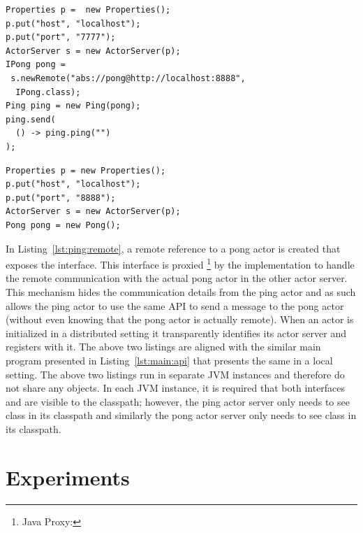 \begin{center}
\begin{minipage}[t]{0.48\textwidth}
\begin{lstlisting}[caption=Remote ping actor main,label=lst:ping:remote]
Properties p =  new Properties();
p.put("host", "localhost");
p.put("port", "7777");
ActorServer s = new ActorServer(p);
IPong pong = 
 s.newRemote("abs://pong@http://localhost:8888",
  IPong.class);
Ping ping = new Ping(pong);
ping.send(
  () -> ping.ping("")
);
\end{lstlisting}
\end{minipage}
\hfill
\begin{minipage}[t]{0.48\textwidth}
\begin{lstlisting}[caption=Remote pong actor main,label=lst:pong:remote]
Properties p = new Properties();
p.put("host", "localhost");
p.put("port", "8888");
ActorServer s = new ActorServer(p);
Pong pong = new Pong();
\end{lstlisting}
\end{minipage}
\end{center}

In Listing~\ref{lst:ping:remote}, a remote reference to a pong actor is created that exposes the  interface.
This interface is proxied
\footnote{Java Proxy: } by the implementation 
to handle the remote communication with the actual pong actor in the other actor server.
This mechanism hides the communication details from the ping actor and as such allows the ping actor to use 
the same API to send a message to the pong actor (without even  knowing that the pong actor is actually remote).
When an actor is initialized in a distributed setting it transparently identifies its actor server and registers with it.
The above two listings are aligned with the similar main program presented in Listing~\ref{lst:main:api} that presents the same in a local setting.
The above two listings run in separate JVM instances and therefore do not share any objects.
In each JVM instance, it is required that both interfaces  and  are visible to the classpath; however, 
the ping actor server only needs to see  class in its classpath and similarly the pong actor server only needs 
to see  class in its classpath.

\section{Experiments}
\label{sec:experiments}

